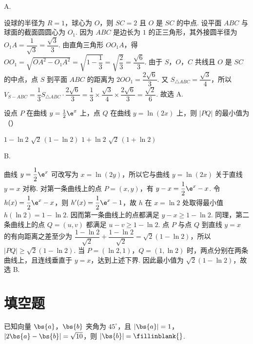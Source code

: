 \begin{answer}
A.
\end{answer}

\begin{solution}
设球的半径为 \(R=1\)，球心为 \(O\)，则 \(SC=2\) 且 \(O\) 是 \(SC\) 的中点. 设平面 \(ABC\) 与球面的截面圆圆心为 \(O_1\). 因为 \(ABC\) 是边长为 \(1\) 的正三角形，其外接圆半径为 \(O_1A=\dfrac{1}{\sqrt3}=\dfrac{\sqrt3}{3}\). 由直角三角形 \(OO_1A\)，得 \(OO_1=\sqrt{OA^2-O_1A^2}=\sqrt{1-\dfrac13}=\sqrt{\dfrac23}=\dfrac{\sqrt6}{3}\). 由于 \(S\)，\(O\)，\(C\) 共线且 \(O\) 是 \(SC\) 的中点，点 \(S\) 到平面 \(ABC\) 的距离为 \(2OO_1=\dfrac{2\sqrt6}{3}\). 又 \(S_{\triangle ABC}=\dfrac{\sqrt3}{4}\)，所以 \(V_{S-ABC}=\dfrac13S_{\triangle ABC}\cdot\dfrac{2\sqrt6}{3}=\dfrac13\times\dfrac{\sqrt3}{4}\times\dfrac{2\sqrt6}{3}=\dfrac{\sqrt2}{6}\). 故选 A.
\end{solution}

\begin{problem}
设点 \(P\) 在曲线 \(y = \frac{1}{2} \e^{x}\) 上，点 \(Q\) 在曲线 \(y = \ln (2x)\) 上，则 \(|PQ|\) 的最小值为（\quad）

\choices
    {\(1 - \ln 2\)}
    {\(\sqrt{2}\,(1 - \ln 2)\)}
    {\(1 + \ln 2\)}
    {\(\sqrt{2}\,(1 + \ln 2)\)}
\end{problem}

\begin{answer}
B.
\end{answer}

\begin{solution}
曲线 \(y=\dfrac12\e^x\) 可改写为 \(x=\ln(2y)\)，所以它与曲线 \(y=\ln(2x)\) 关于直线 \(y=x\) 对称. 对第一条曲线上的点 \(P=(x,y)\)，有 \(y-x=\dfrac12\e^x-x\). 令 \(h(x)=\dfrac12\e^x-x\)，则 \(h'(x)=\dfrac12\e^x-1\)，故 \(h\) 在 \(x=\ln2\) 处取得最小值 \(h(\ln2)=1-\ln2\). 因而第一条曲线上的点都满足 \(y-x\geqslant1-\ln2\). 同理，第二条曲线上的点 \(Q=(u,v)\) 都满足 \(u-v\geqslant1-\ln2\). 点 \(P\) 与点 \(Q\) 到直线 \(y=x\) 的有向距离之差至少为 \(\dfrac{1-\ln2}{\sqrt2}+\dfrac{1-\ln2}{\sqrt2}=\sqrt2(1-\ln2)\)，所以 \(|PQ|\geqslant\sqrt2(1-\ln2)\). 当 \(P=(\ln2,1)\)，\(Q=(1,\ln2)\) 时，两点分别在两条曲线上，且连线垂直于 \(y=x\)，达到上述下界. 因此最小值为 \(\sqrt2(1-\ln2)\)，故选 B.
\end{solution}

\section{填空题}

\begin{problem}
已知向量 \(\bs{a}\)，\(\bs{b}\) 夹角为 \(45^{\circ}\)，且 \(|\bs{a}| = 1\)，\(|2\bs{a} - \bs{b}| = \sqrt{10}\)，则 \(|\bs{b}| =\fillinblank{}\).
\end{problem}

